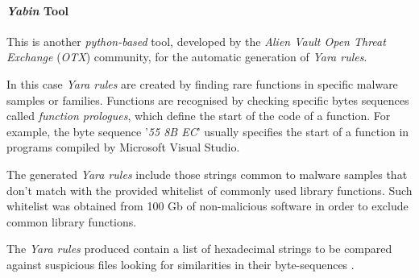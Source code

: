 \documentclass[pdfa%
,cucitura%
]{toptesi}
\begin{document}
\paragraph{\textit{Yabin} Tool}
This is another \textit{python-based} tool, developed by the \textit{Alien Vault Open Threat Exchange} (\textit{OTX}) community, for the automatic generation of \textit{Yara rules}.

In this case \textit{Yara rules} are created by finding rare functions in specific malware samples or families. Functions are recognised by checking specific bytes sequences called \textit{function prologues}, which define the start of the code of a function. For example, the byte sequence '\textit{55 8B EC}' usually specifies the start of a function in programs compiled by Microsoft Visual Studio.

The generated \textit{Yara rules} include those strings common to malware samples that don't match with the provided whitelist of commonly used library functions. Such whitelist was obtained from 100 Gb of non-malicious software in order to exclude common library functions.

The \textit{Yara rules} produced contain a list of hexadecimal strings to be compared against suspicious files looking for similarities in their byte-sequences \cite{NaikEAGYRETE}.
\end{document}
